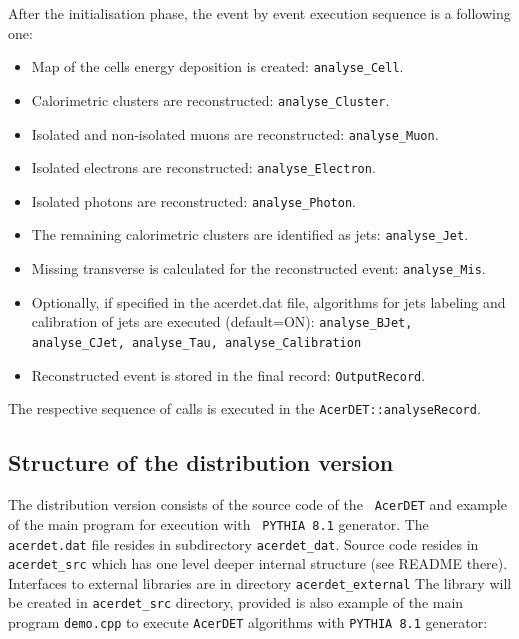 After the initialisation phase, the event by event execution sequence
 is a following one: 
\begin{itemize}
\item
Map of the cells energy deposition is created: {\tt analyse\_Cell}.
\item
Calorimetric clusters are reconstructed: {\tt analyse\_Cluster}.
\item
Isolated and non-isolated muons are reconstructed: {\tt analyse\_Muon}.
\item
Isolated electrons are reconstructed: {\tt analyse\_Electron}.
\item
Isolated photons are reconstructed: {\tt analyse\_Photon}.
\item
The remaining calorimetric clusters are identified as jets: {\tt analyse\_Jet}.
\item
Missing transverse is calculated for the reconstructed event: {\tt analyse\_Mis}.
\item
Optionally, if specified in the acerdet.dat file, algorithms for 
jets labeling and calibration of jets are executed (default=ON): 
{\tt analyse\_BJet, analyse\_CJet, analyse\_Tau, analyse\_Calibration}
\item
Reconstructed event is stored in the final record: {\tt OutputRecord}.
\end{itemize}


The respective sequence of calls is executed in the {\tt AcerDET::analyseRecord}.

\subsection{Structure of the distribution version}

The distribution version consists of the source code of the {\tt
AcerDET} and example of the main program for execution with {\tt
PYTHIA 8.1} generator. The {\tt acerdet.dat} file resides in
subdirectory {\tt acerdet\_dat}. Source code resides in {\tt
acerdet\_src} which has one level deeper internal structure (see README there). 
Interfaces to external libraries are in directory {\tt acerdet\_external}
The library will be created in {\tt acerdet\_src} directory, provided is also
example of the main program {\tt  demo.cpp} to execute {\tt AcerDET} algorithms
with  {\tt PYTHIA 8.1} generator:

